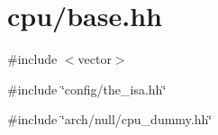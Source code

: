 \hypertarget{cpu_2base_8hh}{
\section{cpu/base.hh}
\label{cpu_2base_8hh}
}
{\ttfamily \#include $<$vector$>$}\par
{\ttfamily \#include \char`\"{}config/the\_\-isa.hh\char`\"{}}\par
{\ttfamily \#include \char`\"{}arch/null/cpu\_\-dummy.hh\char`\"{}}\par
